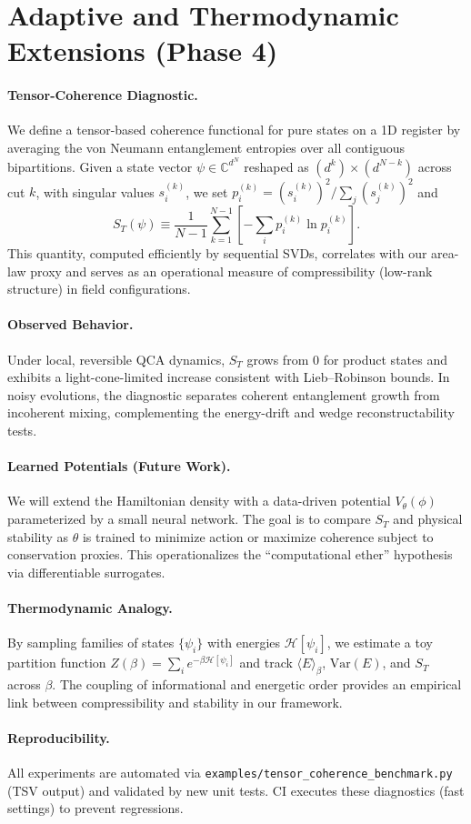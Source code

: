 \section{Adaptive and Thermodynamic Extensions (Phase 4)}
\label{sec:phase4}

\paragraph{Tensor-Coherence Diagnostic.}
We define a tensor-based coherence functional for pure states on a 1D register by averaging the von Neumann entanglement entropies over all contiguous bipartitions. Given a state vector $\psi \in \mathbb{C}^{d^N}$ reshaped as $(d^k)\times(d^{N-k})$ across cut $k$, with singular values $s_i^{(k)}$, we set $p_i^{(k)} = (s_i^{(k)})^2 / \sum_j (s_j^{(k)})^2$ and
\[
S_T(\psi) \equiv \frac{1}{N-1}\sum_{k=1}^{N-1} \left[-\sum_i p_i^{(k)} \ln p_i^{(k)}\right].
\]
This quantity, computed efficiently by sequential SVDs, correlates with our area-law proxy and serves as an operational measure of compressibility (low-rank structure) in field configurations.

\paragraph{Observed Behavior.}
Under local, reversible QCA dynamics, $S_T$ grows from $0$ for product states and exhibits a light-cone-limited increase consistent with Lieb–Robinson bounds. In noisy evolutions, the diagnostic separates coherent entanglement growth from incoherent mixing, complementing the energy-drift and wedge reconstructability tests.

\paragraph{Learned Potentials (Future Work).}
We will extend the Hamiltonian density with a data-driven potential $V_\theta(\phi)$ parameterized by a small neural network. The goal is to compare $S_T$ and physical stability as $\theta$ is trained to minimize action or maximize coherence subject to conservation proxies. This operationalizes the “computational ether” hypothesis via differentiable surrogates.

\paragraph{Thermodynamic Analogy.}
By sampling families of states $\{\psi_i\}$ with energies $\mathcal{H}[\psi_i]$, we estimate a toy partition function $Z(\beta)=\sum_i e^{-\beta \mathcal{H}[\psi_i]}$ and track $\langle E\rangle_\beta$, $\mathrm{Var}(E)$, and $S_T$ across $\beta$. The coupling of informational and energetic order provides an empirical link between compressibility and stability in our framework.

\paragraph{Reproducibility.}
All experiments are automated via \texttt{examples/tensor\_coherence\_benchmark.py} (TSV output) and validated by new unit tests. CI executes these diagnostics (fast settings) to prevent regressions.
